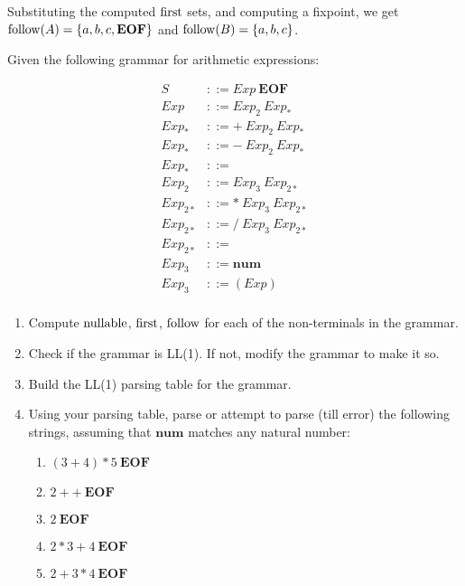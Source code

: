 \begin{exercise}{}
\begin{solution}
\begin{enumerate}
      Substituting the computed \(\operatorname{first}\) sets, and computing a fixpoint, we
      get \(\operatorname{follow}(A) = \{a, b, c,\mathbf{EOF}\}\) and \(\operatorname{follow}(B) = \{a, b,
      c\}\).
    \end{enumerate}
  \end{solution}
\end{exercise}

\begin{exercise}{}
  
  Given the following grammar for arithmetic expressions:

  \begin{align*}
    S &::= Exp~\mathbf{EOF} \\
    Exp &::= Exp_2~ Exp_* \\
    Exp_* &::= +~ Exp_2~ Exp_* \\
    Exp_* &::= -~ Exp_2~ Exp_* \\
    Exp_* &::= \\
    Exp_2 &::= Exp_3~ Exp_{2*} \\
    Exp_{2*} &::= *~ Exp_3~ Exp_{2*} \\
    Exp_{2*} &::= /~ Exp_3~ Exp_{2*} \\
    Exp_{2*} &::= \\
    Exp_3 &::= \mathbf{num} \\
    Exp_3 &::= (Exp) \\
  \end{align*}

  \begin{enumerate}
    \item Compute \(\operatorname{nullable}\), \(\operatorname{first}\), \(\operatorname{follow}\) for each of the
    non-terminals in the grammar.
    \item Check if the grammar is LL(1). If not, modify the grammar to make it
    so.
    \item Build the LL(1) parsing table for the grammar.
    \item Using your parsing table, parse or attempt to parse (till error) the
    following strings, assuming that \(\mathbf{num}\) matches any natural
    number:
    \begin{enumerate}
      \item \((3 + 4) * 5 ~\mathbf{EOF}\)
      \item \(2 + + ~\mathbf{EOF}\)
      \item \(2 ~\mathbf{EOF}\)
      \item \(2 * 3 + 4 ~\mathbf{EOF}\)
      \item \(2 + 3 * 4 ~\mathbf{EOF}\)
    \end{enumerate}
  \end{enumerate}


\end{exercise}
